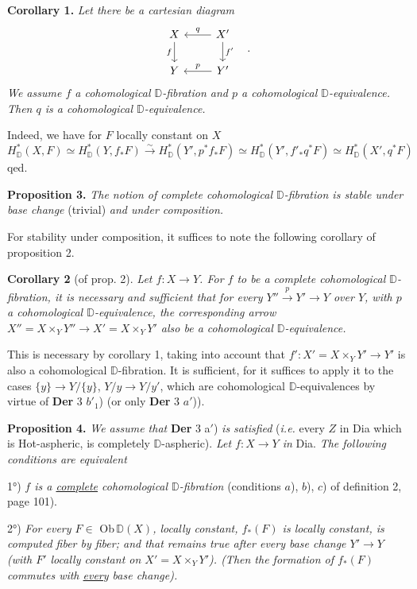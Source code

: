 \documentclass[11pt]{article}
\newcommand{\printedpage}[1]{\marginpar{\footnotesize p.~#1}}
\newcommand{\msp}[1]{\marginpar{\footnotesize [#1]}}
\newcommand{\Hot}{\textsf{Hot}}
\newcommand{\Dia}{\textsf{Dia}}
\newcommand{\Ob}{\textsf{Ob}}
\newcommand{\DD}{\mathbb{D}}
\begin{document}
\textbf{Corollary 1.} \textit{Let there be a cartesian diagram}
\[
\begin{tikzcd}
X & X' \arrow[l, "q"'] \arrow[d, "f'"] \\
Y & Y' \arrow[l, "p"']
\arrow[from=1-1, to=2-1, "f"']
\end{tikzcd}
\quad .
\]
\textit{We assume $f$ a cohomological $\DD$-fibration and $p$ a cohomological $\DD$-equivalence. Then $q$ is a cohomological $\DD$-equivalence.}

\msp{page 103}
Indeed, we have for $F$ locally constant on $X$
\[
H^*_{\DD}(X,F) \simeq H^*_{\DD}(Y, f_*F) \overset{\sim}{\longrightarrow} H^*_{\DD}(Y', p^*f_*F) \simeq H^*_{\DD}(Y', f'_*q^*F) \simeq H^*_{\DD}(X', q^*F)
\]
qed.

\textbf{Proposition 3.} \textit{The notion of complete cohomological $\DD$-fibration is stable under base change} (trivial) \textit{and under composition.}

For stability under composition, it suffices to note the following corollary of proposition 2.

\textbf{Corollary 2} (of prop. 2). \textit{Let $f : X \to Y$. For $f$ to be a complete cohomological $\DD$-fibration, it is necessary and sufficient that for every $Y'' \overset{p}{\to} Y' \to Y$ over $Y$, with $p$ a cohomological $\DD$-equivalence, the corresponding arrow $X'' = X \times_Y Y'' \longrightarrow X' = X \times_Y Y'$ also be a cohomological $\DD$-equivalence.}

This is necessary by corollary 1, taking into account that $f' : X' = X \times_Y Y' \to Y'$ is also a cohomological $\DD$-fibration. It is sufficient, for it suffices to apply it to the cases $\{y\} \to Y/\{y\}$, $Y/y \to Y/y'$, which are cohomological $\DD$-equivalences by
\msp{page 104}
virtue of \textbf{Der} 3 $b'_1$) (or only \textbf{Der} 3 $a'$)).

\printedpage{63}

\textbf{Proposition 4.} \textit{We assume that} \textbf{Der} 3 a$'$) \textit{is satisfied} (\textit{i.e.} every $Z$ in \Dia{} which is \Hot-aspheric, is completely $\DD$-aspheric). \textit{Let $f : X \to Y$ in} \Dia. \textit{The following conditions are equivalent}

1°) \textit{$f$ is a \underline{complete} cohomological $\DD$-fibration} (conditions $a$), $b$), $c$) of definition 2, page 101).

2°) \textit{For every $F \in$} \Ob\,$\DD(X)$\textit{, locally constant, $f_*(F)$ is locally constant, is computed fiber by fiber; and that remains true after every base change $Y' \to Y$ (with $F'$ locally constant on $X' = X \times_Y Y'$). (Then the formation of $f_*(F)$ commutes with \underline{every} base change).}
\end{document}
